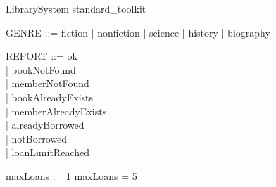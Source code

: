 \documentclass{article}
\begin{document}

\begin{zsection}
  \SECTION LibrarySystem \parents standard\_toolkit
\end{zsection}


\begin{zed}
\end{zed}

\begin{zed}
  GENRE ::= fiction | nonfiction | science | history | biography
\end{zed}

\begin{zed}
  REPORT ::= ok \\
    | bookNotFound \\
    | memberNotFound \\
    | bookAlreadyExists \\
    | memberAlreadyExists \\
    | alreadyBorrowed \\
    | notBorrowed \\
    | loanLimitReached
\end{zed}

\begin{axdef}
  maxLoans : \nat_1
\where
  maxLoans = 5
\end{axdef}

\end{document}
